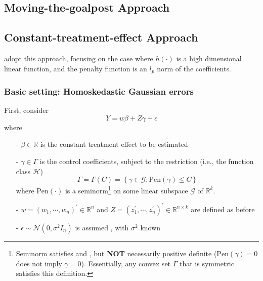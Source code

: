 \documentclass{article}
\begin{document}
\subsection{Moving-the-goalpost Approach}

\subsection{Constant-treatment-effect Approach}
\citet{armstrong2020bias} adopt this approach, focusing on the case where $h(\cdot)$ is a high dimensional linear function, and the penalty function is an $l_p$ norm of the coefficients.

\subsubsection*{Basic setting: Homoskedastic Gaussian errors}
First, consider
\begin{equation}
  Y= w \beta + Z\gamma +\epsilon
\end{equation}
where
\begin{itemize}
  \item[-] $\beta\in\mathbb{R}$ is the constant treatment effect to be estimated 
  \item[-] $\gamma \in \Gamma$ is the control coefficients, subject to the restriction (i.e., the function class $\mathcal{H}$)
  \begin{equation}
    \Gamma = \Gamma(C) = \left\{\gamma \in \mathcal{G}:\mathrm{Pen}(\gamma)\leq C \right\}
  \end{equation}
  where $\mathrm{Pen}(\cdot)$ is a seminorm\footnote{Seminorm satisfies
   and , but \textbf{NOT} necessarily positive definite ($\mathrm{Pen}(\gamma)=0$ does not imply $\gamma=0$). Essentially, any convex set $\Gamma$ that is symmetric satisfies this definition.
  } on some linear subspace $\mathcal{G}$ of $\mathbb{R}^k$.
  \item[-] $w= \left(w_1,\cdots,w_n\right)^{\prime}\in\mathbb{R}^n$ and $Z=\left(z_1^{\prime},\cdots,z_n^{\prime}\right)^{\prime}\in\mathbb{R}^{n\times k}$ are defined as before
  \item[-] $\epsilon \sim \mathcal{N}\left(0,\sigma^2 I_n\right)$ is assumed , with $\sigma^2$ known
\end{itemize}
\end{document}
